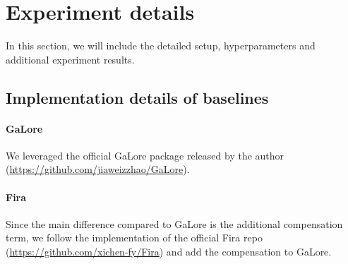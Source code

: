 \section{Experiment details}
\label{app: experiment details}
In this section, we will include the detailed setup, hyperparameters and additional experiment results. 

\subsection{Implementation details of baselines}
\label{subapp: baseline implementation}
\paragraph{GaLore} We leveraged the official GaLore package released by the author (\url{https://github.com/jiaweizzhao/GaLore}). 
\paragraph{Fira} Since the main difference compared to GaLore is the additional compensation term, we follow the implementation of the official Fira repo (\url{https://github.com/xichen-fy/Fira}) and add the compensation to GaLore. 

